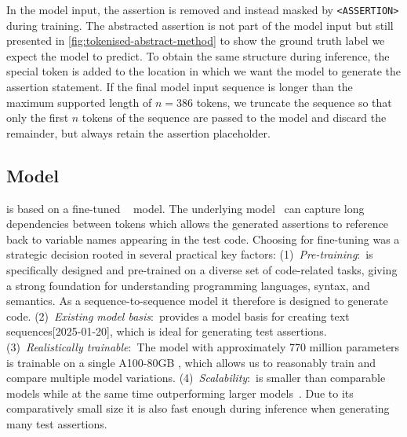 In the model input, the assertion is removed and instead masked by
\texttt{<ASSERTION>} during training. The abstracted assertion is not
part of the model input but still presented in
\cref{fig:tokenised-abstract-method} to show the ground truth label we
expect the model to predict. To obtain the same structure during
inference, the special token is added to the location in which we want
the model to generate the assertion statement.
If the final model input sequence is longer than the maximum supported
length of \(n = 386\) tokens, we truncate the sequence so that only
the first \(n\) tokens of the sequence are passed to the model and
discard the remainder, but always retain the assertion placeholder.


\subsection{Model}\label{sec:model}

\assertfive is based on a fine-tuned \codetfive~\cite{Wang2021} model.
The underlying \tfive model~\cite{Raffel2019} can capture long
dependencies between tokens which allows the generated assertions to
reference back to variable names appearing in the test code.
Choosing \codetfive for fine-tuning was a strategic decision rooted in
several practical key factors:
(1)~\emph{Pre-training}:~\codetfive is specifically designed and
pre-trained on a diverse set of code-related tasks, giving a strong
foundation for understanding programming languages, syntax, and
semantics. As a sequence-to-sequence model it therefore is designed to
generate code.
(2)~\emph{Existing model basis}:~\huggingface provides a model basis
for creating text
sequences[2025-01-20],
which is ideal for generating test assertions.
(3)~\emph{Realistically trainable}:~The model with approximately 770
million parameters is trainable on a single 
A100-80GB \gpu, which allows us to reasonably train and compare
multiple model variations.
(4)~\emph{Scalability}:~\codetfivelarge is smaller than comparable
models while at the same time outperforming larger
models~\cite{Le2022}. Due to its comparatively small size it is also
fast enough during inference when generating many test assertions.



